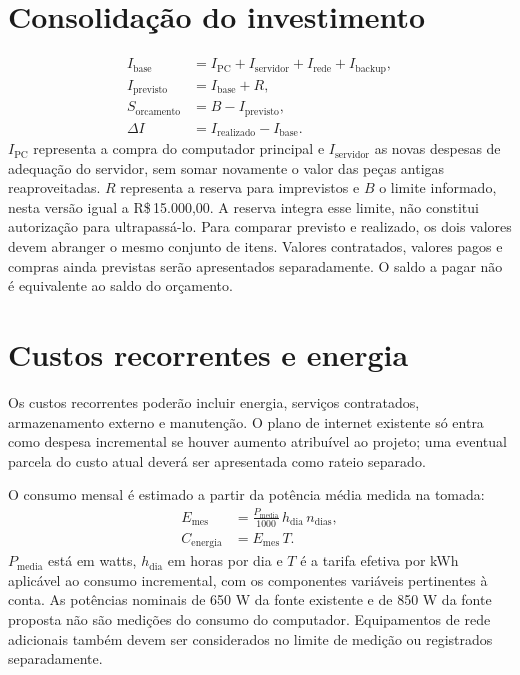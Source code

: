 \documentclass[11pt,a4paper,oneside]{report}
\newcommand{\dinheiro}[1]{R\$\,#1}
\begin{document}
\section{Consolidação do investimento}
\begin{align}
I_{\mathrm{base}} &= I_{\mathrm{PC}} + I_{\mathrm{servidor}}
+ I_{\mathrm{rede}} + I_{\mathrm{backup}},\\
I_{\mathrm{previsto}} &= I_{\mathrm{base}} + R,\\
S_{\mathrm{orcamento}} &= B - I_{\mathrm{previsto}},\\
\Delta I &= I_{\mathrm{realizado}} - I_{\mathrm{base}}.
\end{align}
$I_{\mathrm{PC}}$ representa a compra do computador principal e
$I_{\mathrm{servidor}}$ as novas despesas de adequação do servidor,
sem somar novamente o valor das peças antigas reaproveitadas.
$R$ representa a reserva para imprevistos e $B$ o limite informado,
nesta versão igual a \dinheiro{15.000,00}. A reserva integra esse limite,
não constitui autorização para ultrapassá-lo. Para comparar
previsto e realizado, os dois valores devem abranger o mesmo conjunto de itens.
Valores contratados, valores pagos e compras ainda previstas serão apresentados
separadamente. O saldo a pagar não é equivalente ao saldo do orçamento.

\section{Custos recorrentes e energia}
Os custos recorrentes poderão incluir energia, serviços contratados,
armazenamento externo e manutenção. O plano de internet existente só entra
como despesa incremental se houver aumento atribuível ao projeto; uma eventual
parcela do custo atual deverá ser apresentada como rateio separado.

O consumo mensal é estimado a partir da potência média medida na tomada:
\begin{align}
E_{\mathrm{mes}} &= \frac{P_{\mathrm{media}}}{1000}\,h_{\mathrm{dia}}\,n_{\mathrm{dias}},\\
C_{\mathrm{energia}} &= E_{\mathrm{mes}}\,T.
\end{align}
$P_{\mathrm{media}}$ está em watts, $h_{\mathrm{dia}}$ em horas por dia e $T$ é
a tarifa efetiva por kWh aplicável ao consumo incremental, com os componentes
variáveis pertinentes à conta. As potências nominais de 650 W da fonte existente
e de 850 W da fonte proposta não são medições do consumo do computador.
Equipamentos de rede adicionais também
devem ser considerados no limite de medição ou registrados separadamente.
\end{document}
